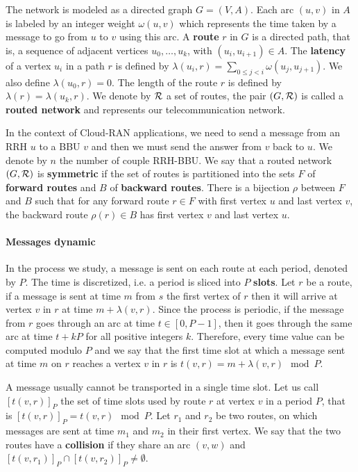 \documentclass[a4paper,10pt,english]{article}
\begin{document}
The network is modeled as a directed graph $G=(V,A)$. Each arc  $(u,v)$ in $A$ is labeled by an integer weight $\omega(u,v)$ which represents the time taken by a message to go from $u$ to $v$ using this arc. A {\bf route} $r$ in $G$ is a directed path, that is, a sequence of adjacent vertices $u_0, \ldots , u_{k}$, with $(u_i,u_{i+1}) \in A$.  The {\bf latency} of a vertex $u_i$ in a path $r$ is defined by $\lambda(u_i,r)= \sum\limits_{0 \leq j <i} \omega(u_j, u_{j+1})$. We also define $\lambda(u_0,r)=0$. The length of the route $r$ is defined by $\lambda (r)= \lambda (u_k,r)$.
We denote by $\cal R$ a set of routes, the pair $(G,\cal R)$ is called a {\bf routed network} and represents our telecommunication network.

   In the context of Cloud-RAN applications, we need to send a message from an RRH $u$ to a BBU $v$ and then 
      we must send the answer from $v$ back to $u$. We denote by $n$ the number of couple RRH-BBU. We say that a routed network $(G, {\cal R})$ is \textbf{symmetric} if the set of routes is partitioned into the sets $F$ of \textbf{forward routes} and $B$ of \textbf{backward routes}. There is a bijection $\rho$ between $F$ and $B$ such that for any forward route $r \in F$ with first vertex $u$ and last vertex $v$, the backward route $\rho(r) \in B$ has first vertex $v$ and last vertex $u$. 
       
 
\paragraph{Messages dynamic}
      
      In the process we study, a message is sent on each route at each period, denoted by $P$. The time is discretized, i.e. a period is sliced into $P$ {\bf slots}. 
      Let $r$ be a route, if a message is sent at time $m$ from $s$ the first vertex of $r$ then it will arrive at vertex $v$ in $r$ at time $m + \lambda(v,r)$. Since the process is periodic, if the message from $r$ goes through an arc at time $t\in [0,P-1]$, then it goes through the same arc at time $t+kP$ for all positive integers $k$. Therefore, every time value can be computed modulo $P$ and we say that the first time slot at which a message sent at time $m$ on $r$ reaches a vertex $v$ in $r$ is $t(v,r) = m + \lambda(v,r)\mod P$. 
      
 A message usually cannot be transported in a single time slot. Let us call $[t(v,r)]_{P}$ the set of time slots used by route $r$ at vertex $v$ in a period $P$, that is $[t(v,r)]_{P} = t(v,r)  \mod P $. Let $r_1$ and $r_2$ be two routes, on which messages are sent at time $m_1$ and $m_2$ in their first vertex.
      We say that the two routes have a {\bf collision} if they share an arc $(v,w)$ and $[t(v,r_{1})]_{P} \cap [t(v,r_{2})]_{P} \neq \emptyset$.
      
\end{document}
